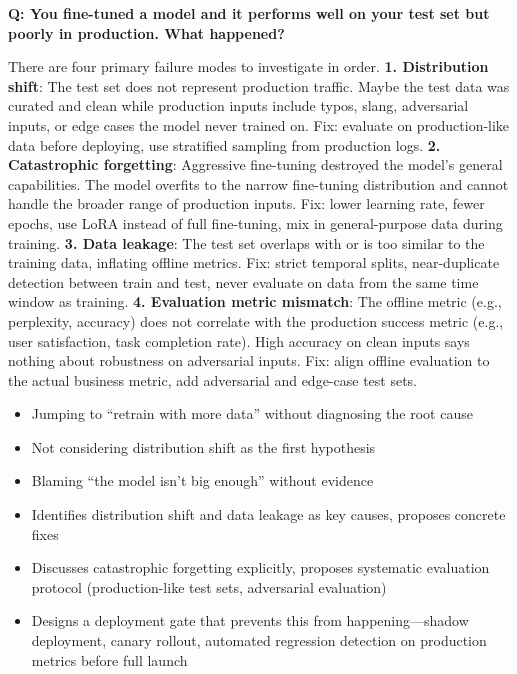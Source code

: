 \begin{interviewq}
\textbf{Q: You fine-tuned a model and it performs well on your test set but poorly in production. What happened?}

 \quad {} \quad \badgefreq{\freqhigh}

\stronganswer There are four primary failure modes to investigate in order. \textbf{1. Distribution shift}: The test set does not represent production traffic. Maybe the test data was curated and clean while production inputs include typos, slang, adversarial inputs, or edge cases the model never trained on. Fix: evaluate on production-like data before deploying, use stratified sampling from production logs. \textbf{2. Catastrophic forgetting}: Aggressive fine-tuning destroyed the model's general capabilities. The model overfits to the narrow fine-tuning distribution and cannot handle the broader range of production inputs. Fix: lower learning rate, fewer epochs, use LoRA instead of full fine-tuning, mix in general-purpose data during training. \textbf{3. Data leakage}: The test set overlaps with or is too similar to the training data, inflating offline metrics. Fix: strict temporal splits, near-duplicate detection between train and test, never evaluate on data from the same time window as training. \textbf{4. Evaluation metric mismatch}: The offline metric (e.g., perplexity, accuracy) does not correlate with the production success metric (e.g., user satisfaction, task completion rate). High accuracy on clean inputs says nothing about robustness on adversarial inputs. Fix: align offline evaluation to the actual business metric, add adversarial and edge-case test sets.

\redflags
\begin{itemize}
    \item Jumping to ``retrain with more data'' without diagnosing the root cause
    \item Not considering distribution shift as the first hypothesis
    \item Blaming ``the model isn't big enough'' without evidence
\end{itemize}


\goodgreat
\begin{itemize}
    \item {} Identifies distribution shift and data leakage as key causes, proposes concrete fixes
    \item {} Discusses catastrophic forgetting explicitly, proposes systematic evaluation protocol (production-like test sets, adversarial evaluation)
    \item {} Designs a deployment gate that prevents this from happening---shadow deployment, canary rollout, automated regression detection on production metrics before full launch
\end{itemize}


\end{interviewq}
